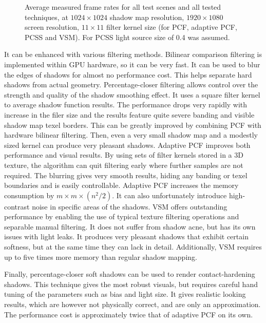 \begin{figure}[t]
    \caption{Average measured frame rates for all test scenes and all tested techniques, at \(1024\times 1024\) shadow map resolution, \(1920\times 1080\) screen resolution, \(11\times 11\) filter kernel size (for PCF, adaptive PCF, PCSS and VSM). For PCSS light source size of 0.4 was assumed.}
    \label{fig:plot:summary_fps}
\end{figure}

It can be enhanced with various filtering methods. Bilinear comparison filtering is implemented within GPU hardware, so it can be very fast. It can be used to blur the edges of shadows for almost no performance cost. This helps separate hard shadows from actual geometry. Percentage-closer filtering allows control over the strength and quality of the shadow smoothing effect. It uses a square filter kernel to average shadow function results. The performance drops very rapidly with increase in the filer size and the results feature quite severe banding and visible shadow map texel borders. This can be greatly improved by combining PCF with hardware bilinear filtering. Then, even a very small shadow map and a modestly sized kernel can produce very pleasant shadows. Adaptive PCF improves both performance and visual results. By using sets of filter kernels stored in a 3D texture, the algorithm can quit filtering early where further samples are not required. The blurring gives very smooth results, hiding any banding or texel boundaries and is easily controllable. Adaptive PCF increases the memory consumption by \(m\times m\times (n^2 / 2)\). It can also unfortunately introduce high-contrast noise in specific areas of the shadows. VSM offers outstanding performance by enabling the use of typical texture filtering operations and separable manual filtering. It does not suffer from shadow acne, but has its own issues with light leaks. It produces very pleasant shadows that exhibit certain softness, but at the same time they can lack in detail. Additionally, VSM requires up to five times more memory than regular shadow mapping.

Finally, percentage-closer soft shadows can be used to render contact-hardening shadows. This technique gives the most robust visuals, but requires careful hand tuning of the parameters such as bias and light size. It gives realistic looking results, which are however not physically correct, and are only an approximation. The performance cost is approximately twice that of adaptive PCF on its own.

